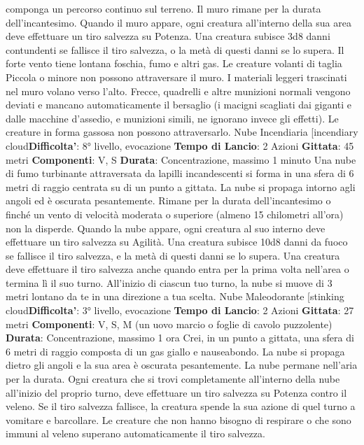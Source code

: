 \begin{multicols}{2}
componga un percorso continuo sul terreno. Il muro
rimane per la durata dell’incantesimo.
Quando il muro appare, ogni creatura all’interno della
sua area deve effettuare un tiro salvezza su Potenza. Una
creatura subisce 3d8 danni contundenti se fallisce il tiro
salvezza, o la metà di questi danni se lo supera.
Il forte vento tiene lontana foschia, fumo e altri gas. Le
creature volanti di taglia Piccola o minore non possono
attraversare il muro. I materiali leggeri trascinati nel
muro volano verso l’alto. Frecce, quadrelli e altre
munizioni normali vengono deviati e mancano
automaticamente il bersaglio (i macigni scagliati dai
giganti e dalle macchine d’assedio, e munizioni simili,
ne ignorano invece gli effetti). Le creature in forma
gassosa non possono attraversarlo.
Nube Incendiaria
[incendiary cloud\textbf{Difficolta'}:
8° livello, evocazione
\textbf{Tempo di Lancio}: 2 Azioni
\textbf{Gittata}: 45 metri
\textbf{Componenti}: V, S
\textbf{Durata}: Concentrazione, massimo 1 minuto
Una nube di fumo turbinante attraversata da lapilli
incandescenti si forma in una sfera di 6 metri di raggio
centrata su di un punto a gittata. La nube si propaga
intorno agli angoli ed è oscurata pesantemente. Rimane
per la durata dell’incantesimo o finché un vento di
velocità moderata o superiore (almeno 15 chilometri
all’ora) non la disperde.
Quando la nube appare, ogni creatura al suo interno
deve effettuare un tiro salvezza su Agilità. Una
creatura subisce 10d8 danni da fuoco se fallisce il tiro
salvezza, e la metà di questi danni se lo supera. Una
creatura deve effettuare il tiro salvezza anche quando
entra per la prima volta nell’area o termina lì il suo
turno.
All’inizio di ciascun tuo turno, la nube si muove di 3
metri lontano da te in una direzione a tua scelta.
Nube Maleodorante
[stinking cloud\textbf{Difficolta'}:
3° livello, evocazione
\textbf{Tempo di Lancio}: 2 Azioni
\textbf{Gittata}: 27 metri
\textbf{Componenti}: V, S, M (un uovo marcio o foglie di
cavolo puzzolente)
\textbf{Durata}: Concentrazione, massimo 1 ora
Crei, in un punto a gittata, una sfera di 6 metri di raggio
composta di un gas giallo e nauseabondo. La nube si
propaga dietro gli angoli e la sua area è oscurata
pesantemente. La nube permane nell’aria per la durata.
Ogni creatura che si trovi completamente all’interno
della nube all’inizio del proprio turno, deve effettuare un
tiro salvezza su Potenza contro il veleno. Se il tiro
salvezza fallisce, la creatura spende la sua azione di
quel turno a vomitare e barcollare. Le creature che non
hanno bisogno di respirare o che sono immuni al veleno
superano automaticamente il tiro salvezza.

\end{multicols}
